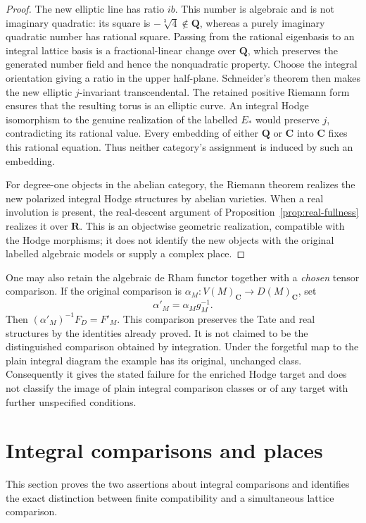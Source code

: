 \documentclass[11pt]{article}
\theoremstyle{definition}\newtheorem{definition}[theorem]{Definition}
\theoremstyle{remark}\newtheorem{remark}[theorem]{Remark}
\newcommand{\Q}{\mathbf Q}\newcommand{\Z}{\mathbf Z}
\newcommand{\R}{\mathbf R}\newcommand{\C}{\mathbf C}
\begin{document}
\begin{proof}
The new elliptic line has ratio $ib$. This number is algebraic and is not
imaginary quadratic: its square is $-\sqrt[3]{4}\notin\Q$, whereas a purely
imaginary quadratic number has rational square. Passing from the rational
eigenbasis to an integral lattice basis is a fractional-linear change over
$\Q$, which preserves the generated number field and hence the nonquadratic
property. Choose the integral orientation giving a ratio in the upper
half-plane. Schneider's theorem \cite[\S1, result IIc, p.~5]{Schneider}
then makes the new elliptic $j$-invariant transcendental. The retained
positive Riemann form ensures that the resulting torus is an elliptic curve.
An integral Hodge isomorphism to the genuine realization of the labelled
$E_*$ would preserve $j$, contradicting its rational value. Every embedding
of either $\Q$ or $\C$ into $\C$ fixes this rational equation. Thus neither
category's assignment is induced by such an embedding.

For degree-one objects in the abelian category, the Riemann theorem realizes
the new polarized integral Hodge structures by abelian varieties. When a real
involution is present, the real-descent argument of
Proposition~\ref{prop:real-fullness} realizes it over $\R$. This is an
objectwise geometric realization, compatible with the Hodge morphisms; it
does not identify the new objects with the original labelled algebraic
models or supply a complex place.
\end{proof}

One may also retain the algebraic de Rham functor together with a
\emph{chosen} tensor comparison. If the original comparison is
$\alpha_M:V(M)_\C\to D(M)_\C$, set
\[
 \alpha'_M=\alpha_Mg_M^{-1}.
\]
Then $(\alpha'_M)^{-1}F_D=F'_M$. This comparison preserves the Tate and real
structures by the identities already proved. It is not claimed to be the
distinguished comparison obtained by integration. Under the forgetful map to
the plain integral diagram the example has its original, unchanged class.
Consequently it gives the stated failure for the enriched Hodge target and
does not classify the image of plain integral comparison classes or of any
target with further unspecified conditions.

\section{Integral comparisons and places}\label{sec:integral}
This section proves the two assertions about integral comparisons and identifies the exact distinction between finite compatibility and a simultaneous lattice comparison.
\end{document}
